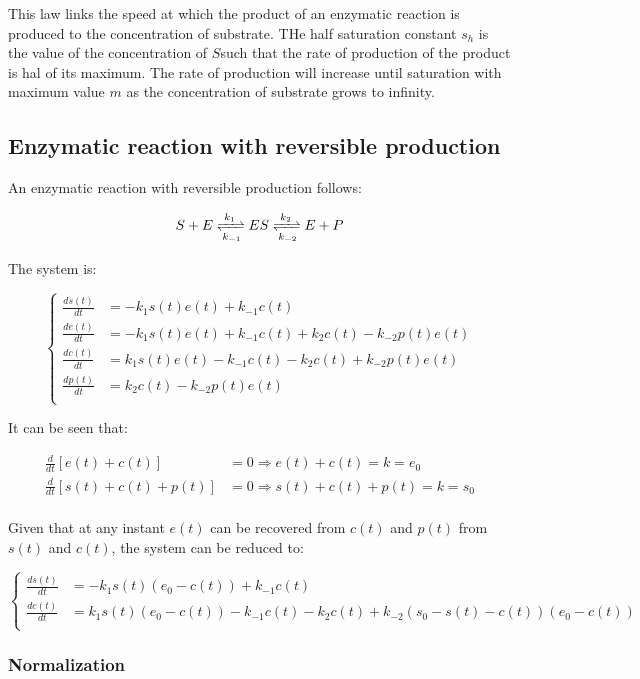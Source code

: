   This law links the speed at which the product of an enzymatic reaction is produced to the concentration of substrate.
  THe half saturation constant $s_h$ is the value of the concentration of $S$such that the rate of production of the product is hal of its maximum.
  The rate of production will increase until saturation with maximum value $m$ as the concentration of substrate grows to infinity.

  \subsection{Enzymatic reaction with reversible production}
  An enzymatic reaction with reversible production follows:

  $$S + E \xrightleftharpoons[k_{-1}]{k_1} ES \xrightleftharpoons[k_{-2}]{k_2} E + P$$

  The system is:

  $$\begin{cases}
    \frac{ds(t)}{dt} &= -k_1s(t)e(t) + k_{-1}c(t)\\
    \frac{de(t)}{dt} &= -k_1s(t)e(t) + k_{-1}c(t) + k_2c(t) - k_{-2}p(t)e(t)\\
    \frac{dc(t)}{dt} &= k_1s(t)e(t) - k_{-1}c(t) - k_2c(t) + k_{-2}p(t)e(t)\\
    \frac{dp(t)}{dt} &= k_2c(t) - k_{-2}p(t)e(t)\\
  \end{cases}$$

  It can be seen that:

  \begin{align*}
    \frac{d}{dt}[e(t)+c(t)] &= 0\Rightarrow e(t) + c(t) = k = e_0\\
    \frac{d}{dt}[s(t) + c(t) + p(t)] &= 0\Rightarrow s(t) + c(t) + p(t) = k =  s_0\\
  \end{align*}

  Given that at any instant $e(t)$ can be recovered from $c(t)$ and $p(t)$ from $s(t)$ and $c(t)$, the system can be reduced to:

  $$\begin{cases}
    \frac{ds(t)}{dt} &= -k_1s(t)(e_0-c(t)) + k_{-1}c(t)\\
    \frac{dc(t)}{dt} &= k_1s(t)(e_0-c(t)) - k_{-1}c(t) - k_2c(t) + k_{-2}(s_0-s(t)-c(t))(e_0-c(t))\\
  \end{cases}$$

    \subsubsection{Normalization}

